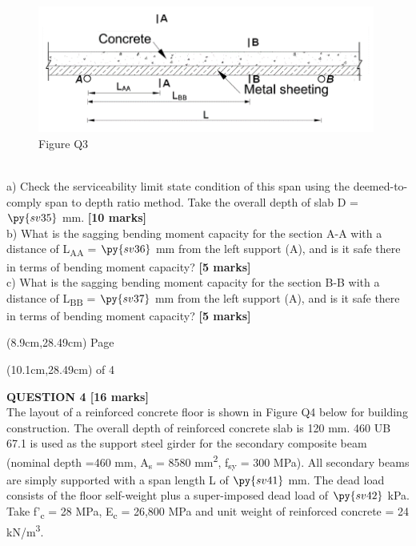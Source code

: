 \documentclass[a4paper,11pt]{article}
\begin{document}
\begin{figure}[ht]
\includegraphics[width=11.08cm, height=4.16cm]{P3.png}\\
\centering
Figure Q3\\
\centering
\end{figure}
\\
a) Check the serviceability limit state condition of this span using the deemed-to-comply span to depth ratio method. Take the overall depth of slab D = $\py{sv35}$ mm. \textbf{[10 marks]}\\
b) What is the sagging bending moment capacity for the section A-A with a distance of L\textsubscript{A}\textsubscript{A} = $\py{sv36}$ mm  from the left support (A), and is it safe there in terms of bending moment capacity? \textbf{[5 marks]}\\
c) What is the sagging bending moment capacity for the section B-B with a distance of L\textsubscript{B}\textsubscript{B} = $\py{sv37}$ mm  from the left support (A), and is it safe there in terms of bending moment capacity? \textbf{[5 marks]}\\
\begin{textblock*}{5cm}(8.9cm,28.49cm)
Page
\end{textblock*}
\begin{textblock*}{5cm}(10.1cm,28.49cm)
of 4
\end{textblock*}
\newpage
\noindent
\textbf{QUESTION 4 [16 marks]}\\
The layout of a reinforced concrete floor is shown in Figure Q4 below for building construction. The overall depth of reinforced concrete slab is 120 mm. 460 UB 67.1 is used as the support steel girder for the secondary composite beam (nominal depth =460 mm, A\textsubscript{s} = 8580 mm\textsuperscript{2}, f\textsubscript{sy} = 300 MPa). All secondary beams are simply supported with a span length L of $\py{sv41}$  mm. The dead load consists of the floor self-weight plus a super-imposed dead load of $\py{sv42}$ kPa. Take f'\textsubscript{c} = 28 MPa, E\textsubscript{c} = 26,800 MPa and unit weight of reinforced concrete = 24 kN/m\textsuperscript{3}.\\
\end{document}

